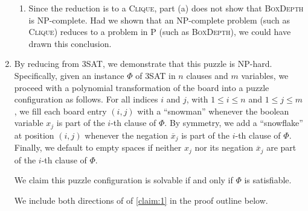 \documentclass[10pt, letterpaper]{article}
\begin{document}
\begin{enumerate}[label={\bfseries Q\arabic*.}]
\begin{enumerate}
      \item
        Since the reduction is to a \textsc{Clique}, part (a) does not show that \textsc{BoxDepth} is
        NP-complete. Had we shown that an NP-complete problem (such as \textsc{Clique}) reduces to a
        problem in P (such as \textsc{BoxDepth}), we could have drawn this conclusion.
    \end{enumerate}

  \item
    By reducing from \textsc{3SAT}, we demonstrate that this puzzle is NP-hard. Specifically, given
    an instance $\Phi$ of \textsc{3SAT} in $n$ clauses and $m$ variables, we proceed with a polynomial
    transformation of the board into a puzzle configuration as follows. For all indices $i$ and $j$,
    with $1 \leq i \leq n$ and $1 \leq j \leq m$, we fill each board entry $(i,j)$ with a ``snowman''
    whenever the boolean variable $x_j$ is part of the $i$-th clause of $\Phi$. By symmetry, we add
    a ``snowflake'' at position $(i,j)$ whenever the negation $\overline{x}_j$ is part of the $i$-th
    clause of $\Phi$. Finally, we default to empty spaces if neither $x_j$ nor its negation $\overline{x}_j$
    are part of the $i$-th clause of $\Phi$. \\

    \begin{claim}
      \label{claim:1}
      We claim this puzzle configuration is solvable if and only if $\Phi$ is satisfiable.
    \end{claim}
    \begin{proof*}
      We include both directions of of \autoref{claim:1} in the proof outline below.
\end{proof*}
\end{enumerate}
\end{document}
